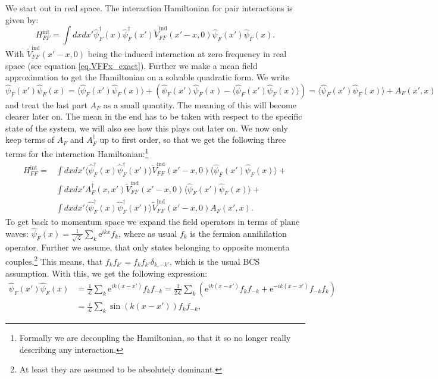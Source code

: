 We start out in real space. The interaction Hamiltonian for pair interactions is given by:
\begin{equation}
H^\text{int}_{FF} = \int dxdx' \hat{\psi}^\dagger_F(x)\hat{\psi}^\dagger_F(x')\tilde{V}^\text{ind}_{FF}(x'-x,0) \hat{\psi}_F(x') \hat{\psi}_F(x).
\label{eq.HFFintdef}
\end{equation}
With $\tilde{V}^\text{ind}_{FF}(x'-x,0)$ being the induced interaction at zero frequency in real space (see equation \eqref{eq.VFFx_exact}). Further we make a mean field approximation to get the Hamiltonian on a solvable quadratic form. We write
\begin{equation}
\hat{\psi}_F(x') \hat{\psi}_F(x) = \langle \hat{\psi}_F(x') \hat{\psi}_F(x) \rangle + \left(\hat{\psi}_F(x') \hat{\psi}_F(x)-\langle \hat{\psi}_F(x') \hat{\psi}_F(x) \rangle \right) = \langle \hat{\psi}_F(x') \hat{\psi}_F(x) \rangle + A_F(x',x)
\end{equation}
and treat the last part $A_F$ as a small quantity. The meaning of this will become clearer later on. The mean in the end has to be taken with respect to the specific state of the system, we will also see how this plays out later on. We now only keep terms of $A_F$ and $A^\dagger_F$ up to first order, so that we get the following three terms for the interaction Hamiltonian:\footnote{Formally we are decoupling the Hamiltonian, so that it so no longer really describing any interaction.}
\begin{align}
H^\text{int}_{FF} = &\int dxdx' \langle \hat{\psi}^\dagger_F(x) \hat{\psi}^\dagger_F(x') \rangle \tilde{V}^\text{ind}_{FF}(x'-x,0) \langle \hat{\psi}_F(x') \hat{\psi}_F(x) \rangle + \nonumber \\
&\int dxdx' A^\dagger_F(x,x') \tilde{V}^\text{ind}_{FF}(x'-x,0) \langle \hat{\psi}_F(x') \hat{\psi}_F(x) \rangle + \nonumber \\
&\int dxdx' \langle \hat{\psi}^\dagger_F(x) \hat{\psi}^\dagger_F(x') \rangle \tilde{V}^\text{ind}_{FF}(x'-x,0) A_F(x',x). \nonumber
\end{align} 
To get back to momentum space we expand the field operators in terms of plane waves: $\hat{\psi}_F(x) = \frac{1}{\sqrt{\mathcal{L}}}\sum_k \text{e}^{ikx} f_k$, where as usual $f_k$ is the fermion annihilation operator. Further we assume, that only states belonging to opposite momenta couples.\footnote{At least they are assumed to be absolutely dominant.} This means, that $f_kf_{k'} = f_kf_{k'}\delta_{k,-k'}$, which is the usual BCS assumption. With this, we get the following expression:
\begin{align}
\hat{\psi}_F(x') \hat{\psi}_F(x) &= \frac{1}{\mathcal{L}}\sum_{k} \text{e}^{ik(x-x')}f_kf_{-k} = \frac{1}{2\mathcal{L}}\sum_{k} \left(\text{e}^{ik(x-x')}f_{k}f_{-k}+\text{e}^{-ik(x-x')}f_{-k}f_{k}\right) \nonumber \\
&= \frac{i}{\mathcal{L}}\sum_{k} \sin(k(x-x'))f_{k}f_{-k}, 
\end{align}
